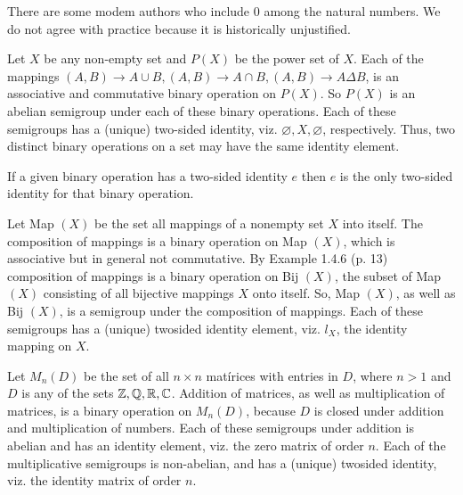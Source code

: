 \documentclass[12pt]{article}
\begin{document}
\begin{rem}
    There are some modem authors who include $ 0 $ among the natural numbers. We do not agree with practice because it is historically unjustified.
\end{rem}
\begin{ex} 
    Let $ X $ be any non-empty set and $ P(X) $ be the power set of $ X $.
    Each of the mappings $ (A, B) \to  A \cup B, (A, B) \to A \cap B, (A, B) \to A\Delta B$, is an associative and commutative binary operation on $ P(X) $. So $ P(X) $ is an abelian semigroup under each of these binary operations. Each of these semigroups has a (unique) two-sided identity, viz. $ \varnothing , X, \varnothing $, respectively. Thus, two distinct binary operations on a set may have the same identity element.
\end{ex}
\begin{rem}
    If a given binary operation has a two-sided identity $ e $ then $ e $ is the only two-sided identity for that binary operation.
\end{rem}
\begin{ex}
    Let Map $ (X) $ be the set all mappings of a nonempty set $ X $ into itself. The composition of mappings is a binary operation on Map $ (X) $, which is associative but in general not commutative. By Example 1.4.6 (p. 13) composition of mappings is a binary operation on Bij $ (X) $, the subset of Map $ (X) $ consisting of all bijective mappings $ X $ onto itself. So, Map $ (X) $, as well as Bij $ (X) $, is a semigroup under the composition of mappings. Each of these semigroups has a (unique) twosided identity element, viz. $ l_X $, the identity mapping on $ X $.
\end{ex}
\begin{ex}
    Let $ M_n (D) $ be the set of all $ n \times n $ matírices with entries in $ D $, where $ n > 1 $ and $ D $ is any of the sets $ \mathbb{Z}, \mathbb{Q}, \mathbb{R}, \mathbb{C} $. Addition of matrices, as well as multiplication of matrices, is a binary operation on $ M_n (D) $, because $ D $ is closed under addition and multiplication of numbers. Each of these semigroups under addition is abelian and has an identity element, viz. the zero matrix of order $ n $. Each of the multiplicative semigroups is non-abelian, and has a (unique) twosided identity, viz. the identity matrix of order $ n $.
\end{ex}
\end{document}
